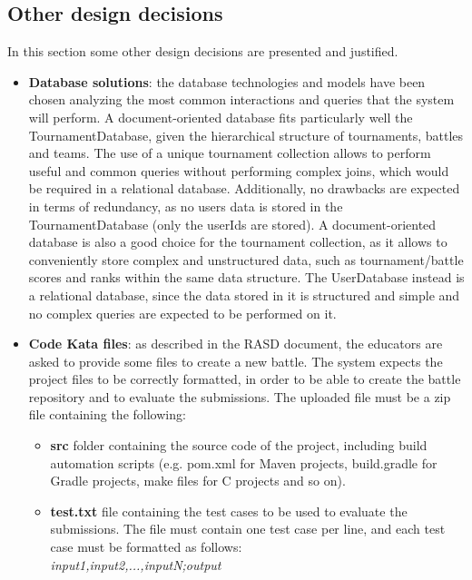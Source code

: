 \subsection{Other design decisions}
In this section some other design decisions are presented and justified.
\begin{itemize}
    \item \textbf{Database solutions}: the database technologies and models have been chosen analyzing the most common interactions and queries that the system will perform. 
    A document-oriented database fits particularly well the TournamentDatabase, given the hierarchical structure of tournaments, battles and teams. The use of a unique tournament collection allows to perform useful and common queries without performing complex joins, which would be required in a relational database.
    Additionally, no drawbacks are expected in terms of redundancy, as no users data is stored in the TournamentDatabase (only the userIds are stored).
    A document-oriented database is also a good choice for the tournament collection, as it allows to conveniently store complex and unstructured data, such as tournament/battle scores and ranks within the same data structure.
    The UserDatabase instead is a relational database, since the data stored in it is structured and simple and no complex queries are expected to be performed on it.
    \item \textbf{Code Kata files}: as described in the RASD document, the educators are asked to provide some files to create a new battle. The system expects the project files to be correctly formatted, in order to be able to create the battle repository and to evaluate the submissions.
    The uploaded file must be a zip file containing the following:
    \begin{itemize}
        \item \textbf{src} folder containing the source code of the project, including build automation scripts (e.g. pom.xml for Maven projects, build.gradle for Gradle projects, make files for C projects and so on). 
        \item \textbf{test.txt} file containing the test cases to be used to evaluate the submissions. The file must contain one test case per line, and each test case must be formatted as follows:\\
         \textit{input1,input2,...,inputN;output}
    \end{itemize}
\end{itemize}